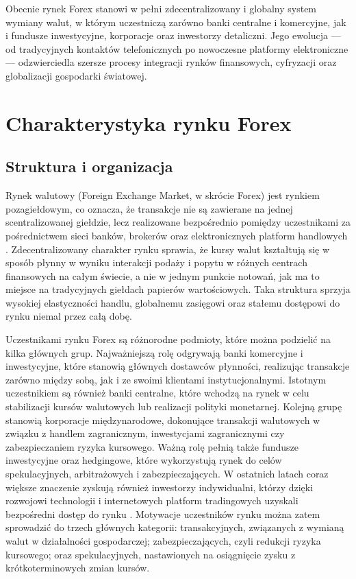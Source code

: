 Obecnie rynek Forex stanowi w pełni zdecentralizowany i globalny system wymiany walut, w którym uczestniczą zarówno banki centralne i komercyjne, jak i fundusze inwestycyjne, korporacje oraz inwestorzy detaliczni.
Jego ewolucja — od tradycyjnych kontaktów telefonicznych po nowoczesne platformy elektroniczne — odzwierciedla szersze procesy integracji rynków finansowych, cyfryzacji oraz globalizacji gospodarki światowej.

\section{Charakterystyka rynku Forex}

\subsection{Struktura i organizacja}

Rynek walutowy (Foreign Exchange Market, w skrócie Forex) jest rynkiem pozagiełdowym, co oznacza, że transakcje nie są zawierane na jednej scentralizowanej giełdzie,
lecz realizowane bezpośrednio pomiędzy uczestnikami za pośrednictwem sieci banków, brokerów oraz elektronicznych platform handlowych \parencite{bis2022}. 
Zdecentralizowany charakter rynku sprawia, że kursy walut kształtują się w sposób płynny w wyniku interakcji podaży i popytu w różnych centrach finansowych na całym świecie,
a nie w jednym punkcie notowań, jak ma to miejsce na tradycyjnych giełdach papierów wartościowych. 
Taka struktura sprzyja wysokiej elastyczności handlu, globalnemu zasięgowi oraz stałemu dostępowi do rynku niemal przez całą dobę.

Uczestnikami rynku Forex są różnorodne podmioty, które można podzielić na kilka głównych grup. 
Najważniejszą rolę odgrywają banki komercyjne i inwestycyjne, które stanowią głównych dostawców płynności, realizując transakcje zarówno między sobą, jak i ze swoimi klientami instytucjonalnymi. 
Istotnym uczestnikiem są również banki centralne, które wchodzą na rynek w celu stabilizacji kursów walutowych lub realizacji polityki monetarnej. 
Kolejną grupę stanowią korporacje międzynarodowe, dokonujące transakcji walutowych w związku z handlem zagranicznym, inwestycjami zagranicznymi czy zabezpieczaniem ryzyka kursowego. 
Ważną rolę pełnią także fundusze inwestycyjne oraz hedgingowe, które wykorzystują rynek do celów spekulacyjnych, arbitrażowych i zabezpieczających. 
W ostatnich latach coraz większe znaczenie zyskują również inwestorzy indywidualni, którzy dzięki rozwojowi technologii i internetowych platform tradingowych uzyskali bezpośredni dostęp do rynku \parencite{madura2018}. 
Motywacje uczestników rynku można zatem sprowadzić do trzech głównych kategorii: transakcyjnych, związanych z wymianą walut w działalności gospodarczej; 
zabezpieczających, czyli redukcji ryzyka kursowego; oraz spekulacyjnych, nastawionych na osiągnięcie zysku z krótkoterminowych zmian kursów.

